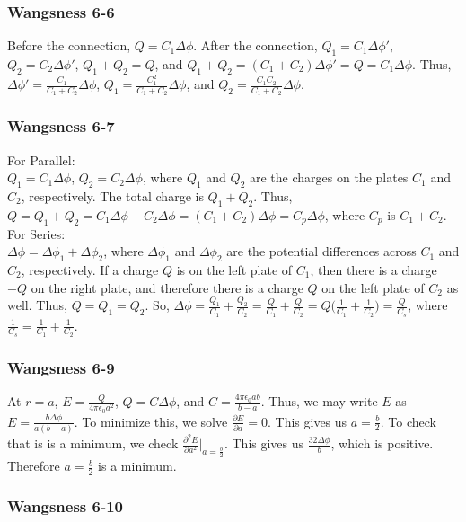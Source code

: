 \documentclass[oneside]{book}
\theoremstyle{definition}
\begin{document}
\subsubsection{Wangsness 6-6}

Before the connection, $Q=C_1 \Delta \phi$. After the connection, $Q_1 = C_1 \Delta\phi'$, $Q_2 = C_2 \Delta \phi'$, $Q_1+Q_2=Q$, and $Q_1+Q_2=(C_1+C_2)\Delta \phi' = Q = C_1\Delta \phi$. Thus, $\Delta \phi' = \frac{C_1}{C_1+C_2}\Delta \phi$, $Q_1 = \frac{C_1^2}{C_1+C_2}\Delta \phi$, and $Q_2 = \frac{C_1 C_2}{C_1+C_2}\Delta \phi$.

\subsubsection{Wangsness 6-7}
For Parallel:\\
$Q_1 = C_1\Delta \phi$, $Q_2 = C_2\Delta \phi$, where $Q_1$ and $Q_2$ are the charges on the plates $C_1$ and $C_2$, respectively. The total charge is $Q_1+Q_2$. Thus, $Q=Q_1+Q_2 = C_1\Delta\phi + C_2 \Delta \phi =(C_1+C_2)\Delta\phi = C_p \Delta \phi$, where $C_p$ is $C_1+C_2$. \\
For Series:\\
$\Delta \phi = \Delta\phi_1 + \Delta \phi_2$, where $\Delta\phi_1$ and $\Delta \phi_2$ are the potential differences across $C_1$ and $C_2$, respectively. If a charge $Q$ is on the left plate of $C_1$, then there is a charge $-Q$ on the right plate, and therefore there is a charge $Q$ on the left plate of $C_2$ as well. Thus, $Q=Q_1=Q_2$. So, $\Delta \phi = \frac{Q_1}{C_1} + \frac{Q_2}{C_2} = \frac{Q}{C_1}+\frac{Q}{C_2} = Q\big(\frac{1}{C_1}+\frac{1}{C_2}\big) = \frac{Q}{C_s}$, where $\frac{1}{C_s} = \frac{1}{C_1}+\frac{1}{C_2}$.

\subsubsection{Wangsness 6-9}

At $r=a$, $E=\frac{Q}{4\pi \epsilon_0 a^2}$, $Q=C\Delta \phi$, and $C=\frac{4\pi \epsilon_0 ab}{b-a}$. Thus, we may write $E$ as $E=\frac{b\Delta \phi}{a(b-a)}$. To minimize this, we solve $\frac{\partial E}{\partial a} = 0$. This gives us $a=\frac{b}{2}$. To check that is is a minimum, we check $\frac{\partial^2 E}{\partial a^2}\bigg|_{a=\frac{b}{2}}$. This gives us $\frac{32\Delta \phi}{b}$, which is positive. Therefore $a=\frac{b}{2}$ is a minimum.

\subsubsection{Wangsness 6-10}
\end{document}
